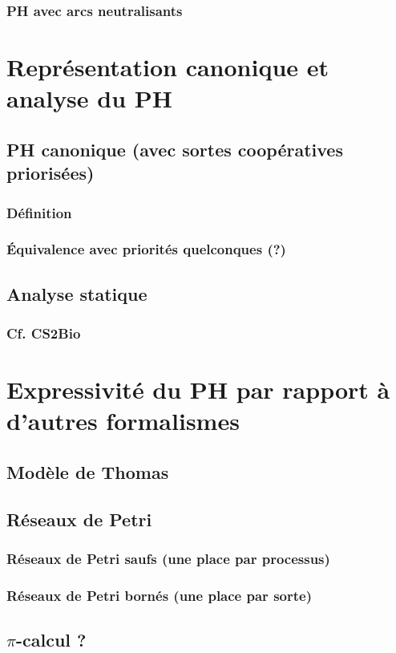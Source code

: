 \documentclass[a4paper]{report}
\begin{document}
    \subsection{PH avec arcs neutralisants}

\chapter{Représentation canonique et analyse du PH}
  \section{PH canonique (avec sortes coopératives priorisées)}
    \subsection{Définition}
    \subsection{Équivalence avec priorités quelconques (?)}
  \section{Analyse statique}
    \subsection{Cf. CS2Bio}

\chapter{Expressivité du PH par rapport à d'autres formalismes}
  \section{Modèle de Thomas}
  \section{Réseaux de Petri}
    \subsection{Réseaux de Petri saufs (une place par processus)}
    \subsection{Réseaux de Petri bornés (une place par sorte)}
  \section{$\pi$-calcul ?}
\end{document}
